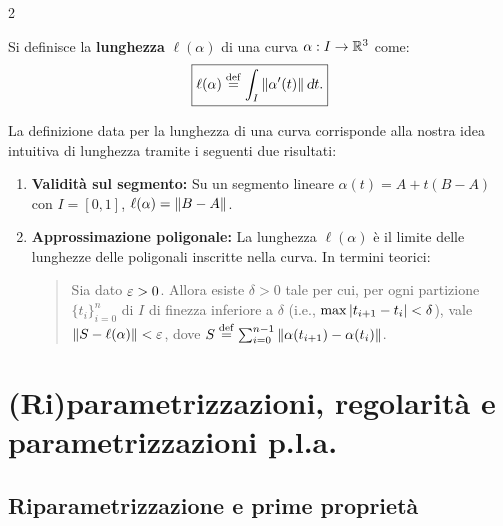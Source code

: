 \begin{multicols*}{2}
    \begin{definition}
        Si definisce la \textbf{lunghezza} $\ell(\alpha)$ di una curva
        $\alpha : I \to \mathbb{R}^3$ come:
        \[
            \boxed{\ell(\alpha) \defeq \int_I \norm{\alpha'(t)} \dt.}
        \]
    \end{definition}

    \begin{remark}
        La definizione data per la lunghezza di una curva corrisponde alla nostra
        idea intuitiva di lunghezza tramite i seguenti due risultati:

        \begin{enumerate}
            \item \textbf{Validità sul segmento:} Su un segmento lineare $\alpha(t) = A + t(B-A)$ con $I = [0, 1]$,
                  $\ell(\alpha) = \left\lVert B-A \right\rVert$.
            \item \textbf{Approssimazione poligonale:} La lunghezza $\ell(\alpha)$ è il limite delle lunghezze delle poligonali
                  inscritte nella curva. In termini teorici:

                  \begin{quote}
                      Sia dato $\varepsilon > 0$. Allora esiste $\delta > 0$ tale per cui, per ogni partizione $\{t_i\}_{i=0}^n$
                      di $I$ di finezza inferiore a $\delta$ (i.e., $\max \left\lvert t_{i+1} - t_i \right\rvert < \delta$), vale $\left\lVert S - \ell(\alpha) \right\rVert < \varepsilon$,
                      dove $S \overset{\mathrm{def}}{=} \sum_{i=0}^{n-1} \left\lVert \alpha(t_{i+1}) - \alpha(t_{i}) \right\rVert$.
                  \end{quote}
        \end{enumerate}
    \end{remark}

    \section{(Ri)parametrizzazioni, regolarità e parametrizzazioni p.l.a.}

    \subsection{Riparametrizzazione e prime proprietà}


\end{multicols*}
